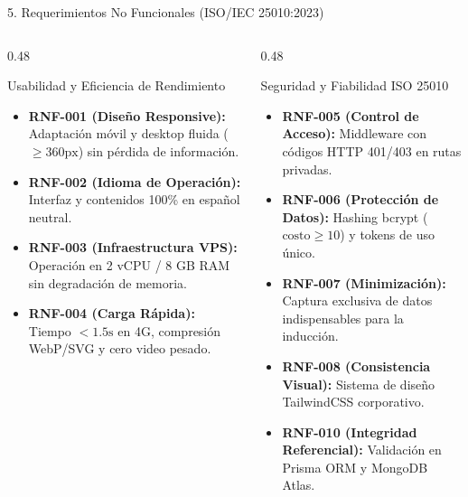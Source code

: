 \documentclass[aspectratio=169, 10pt, spanish]{beamer}
\begin{document}
\begin{frame}{5. Requerimientos No Funcionales (ISO/IEC 25010:2023)}
\begin{columns}[T]
    \begin{column}{0.48\textwidth}
        \begin{academicbox}{Usabilidad y Eficiencia de Rendimiento}
            \scriptsize
            \begin{itemize}
                \item \textbf{RNF-001 (Diseño Responsive):} Adaptación móvil y desktop fluida ($\ge 360\text{px}$) sin pérdida de información.
                \item \textbf{RNF-002 (Idioma de Operación):} Interfaz y contenidos 100\% en español neutral.
                \item \textbf{RNF-003 (Infraestructura VPS):} Operación en 2 vCPU / 8 GB RAM sin degradación de memoria.
                \item \textbf{RNF-004 (Carga Rápida):} Tiempo $< 1.5\text{s}$ en 4G, compresión WebP/SVG y cero video pesado.
            \end{itemize}
        \end{academicbox}
    \end{column}
    \begin{column}{0.48\textwidth}
        \begin{academicbox}{Seguridad y Fiabilidad ISO 25010}
            \scriptsize
            \begin{itemize}
                \item \textbf{RNF-005 (Control de Acceso):} Middleware con códigos HTTP 401/403 en rutas privadas.
                \item \textbf{RNF-006 (Protección de Datos):} Hashing bcrypt ($\text{costo} \ge 10$) y tokens de uso único.
                \item \textbf{RNF-007 (Minimización):} Captura exclusiva de datos indispensables para la inducción.
                \item \textbf{RNF-008 (Consistencia Visual):} Sistema de diseño TailwindCSS corporativo.
                \item \textbf{RNF-010 (Integridad Referencial):} Validación en Prisma ORM y MongoDB Atlas.
            \end{itemize}
        \end{academicbox}
    \end{column}
\end{columns}
\end{frame}
\end{document}
